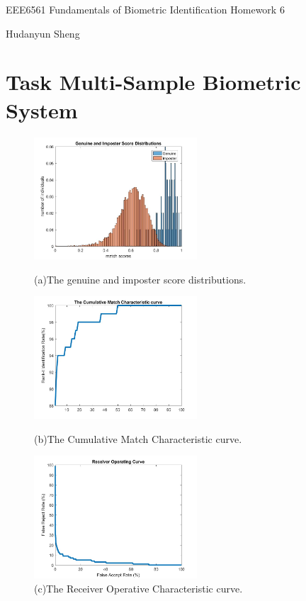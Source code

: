 \documentclass[a4paper]{article}
\begin{document}
\begin{spacing}{2.0}
\begin{flushleft}\begin{huge}EEE6561  Fundamentals of Biometric Identification   Homework 6\end{huge}
\end{flushleft}
\begin{flushright}\begin{Large}Hudanyun Sheng\end{Large}\end{flushright}

\section*{\huge\textbf{ Task \uppercase\expandafter{} Multi-Sample Biometric System}  }
	\normalsize
	\begin{figure}[H]
	\begin{minipage}[t]{0.3\linewidth}
	\centering
	\includegraphics[width=2.4in]{Part1Dis.jpg}
	\caption{(a)The genuine and imposter score distributions.}
	\label{scoDis1}
	\end{minipage}
	\begin{minipage}[t]{0.3\linewidth}
	\centering
	\includegraphics[width=2.4in]{Part1CMC.jpg}
	\caption{(b)The Cumulative Match Characteristic curve.}
	\label{CMC1}
	\end{minipage}
	\begin{minipage}[t]{0.3\linewidth}
	\centering
	\includegraphics[width=2.4in]{Part1ROC.jpg}
	\caption{(c)The Receiver Operative Characteristic curve.}
	\label{ROC1}
	\end{minipage}
	\end{figure}


\end{spacing}
\end{document}
